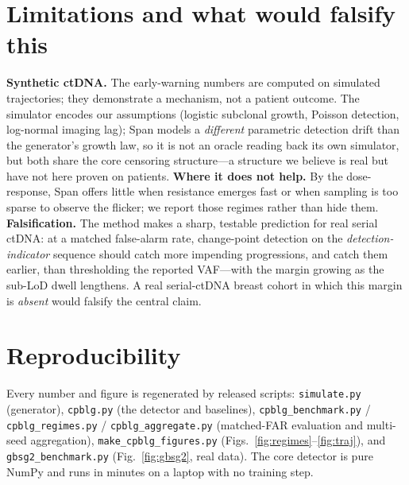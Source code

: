 \documentclass[11pt]{article}
\newcommand{\1}{\mathbf{1}}
\begin{document}
\section{Limitations and what would falsify this}
\textbf{Synthetic ctDNA.} The early-warning numbers are computed on simulated
trajectories; they demonstrate a mechanism, not a patient outcome. The simulator
encodes our assumptions (logistic subclonal growth, Poisson detection, log-normal
imaging lag); Span models a \emph{different} parametric detection drift than the
generator's growth law, so it is not an oracle reading back its own simulator, but
both share the core censoring structure---a structure we believe is real but have
not here proven on patients.
\textbf{Where it does not help.} By the dose-response, Span offers little when
resistance emerges fast or when sampling is too sparse to observe the flicker; we
report those regimes rather than hide them.
\textbf{Falsification.} The method makes a sharp, testable prediction for real
serial ctDNA: at a matched false-alarm rate, change-point detection on the
\emph{detection-indicator} sequence should catch more impending progressions, and
catch them earlier, than thresholding the reported VAF---with the margin growing
as the sub-LoD dwell lengthens. A real serial-ctDNA breast cohort in which this
margin is \emph{absent} would falsify the central claim.

\section{Reproducibility}
Every number and figure is regenerated by released scripts:
\texttt{simulate.py} (generator), \texttt{cpblg.py} (the detector and baselines),
\texttt{cpblg\_benchmark.py} / \texttt{cpblg\_regimes.py} /
\texttt{cpblg\_aggregate.py} (matched-FAR evaluation and multi-seed aggregation),
\texttt{make\_cpblg\_figures.py} (Figs.~\ref{fig:regimes}--\ref{fig:traj}), and
\texttt{gbsg2\_benchmark.py} (Fig.~\ref{fig:gbsg2}, real data). The core detector
is pure NumPy and runs in minutes on a laptop with no training step.

\end{document}
